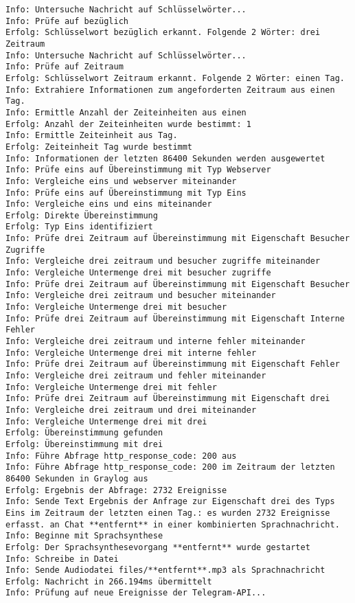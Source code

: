 \begin{lstlisting}[caption={Konsolenausgabe bei der Verarbeitung einer eintreffenden Nachricht}, label=log-msg, xleftmargin=6mm]
Info: Untersuche Nachricht auf Schlüsselwörter... 
Info: Prüfe auf bezüglich 
Erfolg: Schlüsselwort bezüglich erkannt. Folgende 2 Wörter: drei Zeitraum 
Info: Untersuche Nachricht auf Schlüsselwörter... 
Info: Prüfe auf Zeitraum 
Erfolg: Schlüsselwort Zeitraum erkannt. Folgende 2 Wörter: einen Tag. 
Info: Extrahiere Informationen zum angeforderten Zeitraum aus einen Tag. 
Info: Ermittle Anzahl der Zeiteinheiten aus einen 
Erfolg: Anzahl der Zeiteinheiten wurde bestimmt: 1 
Info: Ermittle Zeiteinheit aus Tag. 
Erfolg: Zeiteinheit Tag wurde bestimmt 
Info: Informationen der letzten 86400 Sekunden werden ausgewertet 
Info: Prüfe eins auf Übereinstimmung mit Typ Webserver 
Info: Vergleiche eins und webserver miteinander 
Info: Prüfe eins auf Übereinstimmung mit Typ Eins 
Info: Vergleiche eins und eins miteinander 
Erfolg: Direkte Übereinstimmung 
Erfolg: Typ Eins identifiziert 
Info: Prüfe drei Zeitraum auf Übereinstimmung mit Eigenschaft Besucher Zugriffe 
Info: Vergleiche drei zeitraum und besucher zugriffe miteinander 
Info: Vergleiche Untermenge drei mit besucher zugriffe 
Info: Prüfe drei Zeitraum auf Übereinstimmung mit Eigenschaft Besucher 
Info: Vergleiche drei zeitraum und besucher miteinander 
Info: Vergleiche Untermenge drei mit besucher 
Info: Prüfe drei Zeitraum auf Übereinstimmung mit Eigenschaft Interne Fehler 
Info: Vergleiche drei zeitraum und interne fehler miteinander 
Info: Vergleiche Untermenge drei mit interne fehler 
Info: Prüfe drei Zeitraum auf Übereinstimmung mit Eigenschaft Fehler 
Info: Vergleiche drei zeitraum und fehler miteinander 
Info: Vergleiche Untermenge drei mit fehler 
Info: Prüfe drei Zeitraum auf Übereinstimmung mit Eigenschaft drei 
Info: Vergleiche drei zeitraum und drei miteinander 
Info: Vergleiche Untermenge drei mit drei 
Erfolg: Übereinstimmung gefunden 
Erfolg: Übereinstimmung mit drei 
Info: Führe Abfrage http_response_code: 200 aus 
Info: Führe Abfrage http_response_code: 200 im Zeitraum der letzten 86400 Sekunden in Graylog aus 
Erfolg: Ergebnis der Abfrage: 2732 Ereignisse 
Info: Sende Text Ergebnis der Anfrage zur Eigenschaft drei des Typs Eins im Zeitraum der letzten einen Tag.: es wurden 2732 Ereignisse erfasst. an Chat **entfernt** in einer kombinierten Sprachnachricht. 
Info: Beginne mit Sprachsynthese 
Erfolg: Der Sprachsynthesevorgang **entfernt** wurde gestartet 
Info: Schreibe in Datei 
Info: Sende Audiodatei files/**entfernt**.mp3 als Sprachnachricht 
Erfolg: Nachricht in 266.194ms übermittelt 
Info: Prüfung auf neue Ereignisse der Telegram-API... 
\end{lstlisting}
